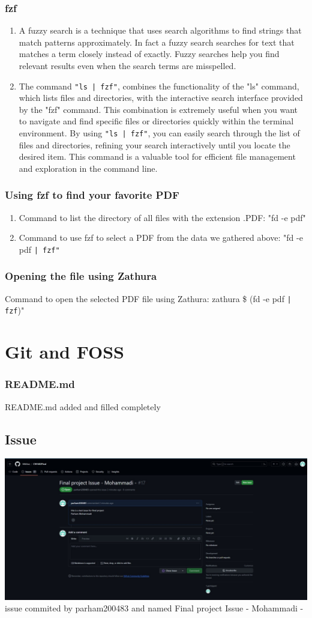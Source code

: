 \documentclass[titlepage]{article}
\begin{document}
\subsubsection{fzf}
\begin{enumerate}
\item A fuzzy search is a technique that uses search algorithms to find strings that match patterns approximately. In fact a fuzzy search searches for text that matches a term closely instead of exactly. Fuzzy searches help you find relevant results even when the search terms are misspelled.
\item The command \texttt{"ls | fzf"}, combines the functionality of the "ls" command, which lists files and directories, with the interactive search interface provided by the "fzf" command. This combination is extremely useful when you want to navigate and find specific files or directories quickly within the terminal environment. By using \texttt{"ls | fzf"}, you can easily search through the list of files and directories, refining your search interactively until you locate the desired item. This command is a valuable tool for efficient file management and exploration in the command line.
\end{enumerate}
\newpage
{}
\fancyhead[R]{}
\subsubsection{Using fzf to find your favorite PDF}
\begin{enumerate}
\item Command to list the directory of all files with the extension .PDF: "fd -e pdf"
\item Command to use fzf to select a PDF from the data we gathered above: "fd -e pdf \texttt{| fzf"}
\end{enumerate}
\subsubsection{ Opening the file using Zathura}
Command to open the selected PDF file using Zathura: zathura  \$ (fd -e pdf \texttt{| fzf})" 
\section {Git and FOSS}
\subsubsection{README.md}
README.md added and filled completely
\subsection {Issue}
\includegraphics[width=\textwidth,height=\textheight,keepaspectratio]{final-project-Parham Mohammadi.jpg}
\newline \newline issue commited by parham200483 and named Final project Issue - Mohammadi -
\end{document}
